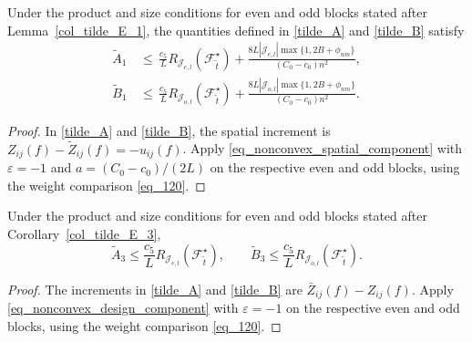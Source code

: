 \documentclass[twoside,11pt]{article}
\newenvironment{revision}{\color{revisionred}}{}
\begin{document}
\begin{revision}
\begin{corollary}
\label{col_tilde_A_1}
Under the product and size conditions for even and odd blocks
stated after Lemma~\ref{col_tilde_E_1}, the quantities
defined in \eqref{tilde_A} and \eqref{tilde_B} satisfy
\begin{align*}
\tilde A_1
&\,\leq\,\frac{c_5}{L}
R_{\mathcal J_{e,l}}(\mathcal F_{\tilde t}^{\star})
+\frac{8L|\mathcal J_{e,l}|\max\{1,2B+\phi_{nm}\}}
       {(C_0-c_0)n^2},\\
\tilde B_1
&\,\leq\,\frac{c_5}{L}
R_{\mathcal J_{o,l}}(\mathcal F_{\tilde t}^{\star})
+\frac{8L|\mathcal J_{o,l}|\max\{1,2B+\phi_{nm}\}}
       {(C_0-c_0)n^2}.
\end{align*}
\end{corollary}
\begin{proof}
In \eqref{tilde_A} and \eqref{tilde_B}, the spatial increment is
$Z_{ij}(f)-\tilde Z_{ij}(f)=-u_{ij}(f)$.
Apply \eqref{eq_nonconvex_spatial_component} with
$\varepsilon=-1$ and $a=(C_0-c_0)/(2L)$ on the respective even
and odd blocks, using the weight comparison \eqref{eq_120}.
\end{proof}
\end{revision}


\begin{revision}
\begin{corollary}
\label{col_tilde_A_3}
Under the product and size conditions for even and odd blocks
stated after Corollary~\ref{col_tilde_E_3},
\[
\tilde A_3\leq\frac{c_5}{L}
R_{\mathcal J_{e,l}}(\mathcal F_{\tilde t}^{\star}),
\qquad
\tilde B_3\leq\frac{c_5}{L}
R_{\mathcal J_{o,l}}(\mathcal F_{\tilde t}^{\star}).
\]
\end{corollary}
\begin{proof}
The increments in \eqref{tilde_A} and \eqref{tilde_B} are
$\bar Z_{ij}(f)-Z_{ij}(f)$.
Apply \eqref{eq_nonconvex_design_component} with
$\varepsilon=-1$ on the respective even and odd blocks, using
the weight comparison \eqref{eq_120}.
\end{proof}
\end{revision}
\end{document}

